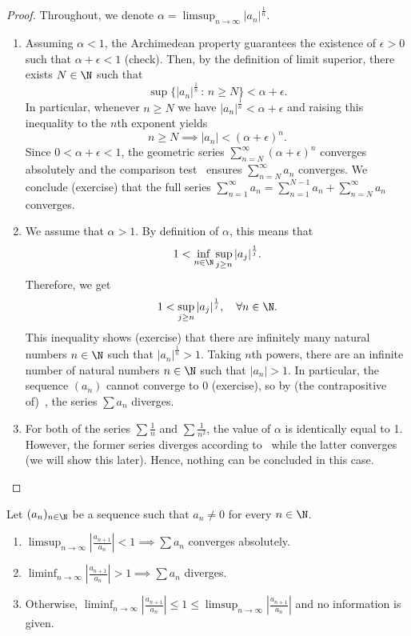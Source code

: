 \begin{proof}
	Throughout, we denote $\alpha = \limsup_{n\to\infty} |a_n|^\frac{1}{n}$.
	\begin{enumerate}[label=\textbf{Root \arabic*)}]
		\item Assuming $\alpha<1$, the Archimedean property guarantees the existence of $\epsilon>0$ such that $\alpha + \epsilon<1$ (check). Then, by the definition of limit superior, there exists $N\in\N$ such that
		\[
		\sup\{ |a_n|^\frac{1}{n} \, : \, n \ge N\} < \alpha + \epsilon.
		\]
		In particular, whenever $n\ge N$ we have $|a_n|^\frac{1}{n} < \alpha + \epsilon$ and raising this inequality to the $n$th exponent yields
		\[
		n\ge N \implies |a_n| < (\alpha + \epsilon)^n.
		\]
		Since $0 < \alpha + \epsilon<1$, the geometric series $\sum_{n=N}^\infty (\alpha + \epsilon)^n$ converges absolutely and the comparison test~ ensures $\sum_{n=N}^\infty a_n$ converges. We conclude (exercise) that the full series $\sum_{n=1}^\infty a_n = \sum_{n=1}^{N-1}a_n + \sum_{n=N}^\infty a_n$ converges.
		\item We assume that $\alpha>1$. By definition of $\alpha$, this means that
		\[
		1 < \inf_{n\in\N} \sup_{j\ge n} |a_j|^\frac{1}{j}.
		\]
		Therefore, we get
		\[
		1 < \sup_{j\ge n} |a_j|^\frac{1}{j}, \quad \forall n\in\N.
		\]
		This inequality shows (exercise) that there are infinitely many natural numbers $n\in\N$ such that $|a_n|^\frac{1}{n}>1$. Taking $n$th powers, there are an infinite number of natural numbers $n\in\N$ such that $|a_n|>1$. In particular, the sequence $(a_n)$ cannot converge to 0 (exercise), so by (the contrapositive of)~, the series $\sum a_n$ diverges.
		\item For both of the series $\sum \frac{1}{n}$ and $\sum \frac{1}{n^2}$, the value of $\alpha$ is identically equal to 1. However, the former series diverges according to~ while the latter converges (we will show this later). Hence, nothing can be concluded in this case.
	\end{enumerate}
\end{proof}
\begin{thm}
	\label{thm:ratiotest}
	Let $(a_n)_{n\in\N}$ be a sequence such that $a_n \neq 0$ for every $n\in\N$.
	\begin{enumerate}[label=\textbf{Ratio \arabic*)}]
		\item $\limsup_{n\to \infty}\left|\frac{a_{n+1}}{a_n}\right| <1 \implies \sum a_n$ converges absolutely.
		\item $\liminf_{n\to \infty}\left|\frac{a_{n+1}}{a_n}\right| >1 \implies \sum a_n$ diverges.
		\item Otherwise, $\liminf_{n\to \infty}\left|\frac{a_{n+1}}{a_n}\right| \le 1 \le \limsup_{n\to \infty}\left|\frac{a_{n+1}}{a_n}\right|$ and no information is given.
	\end{enumerate}
\end{thm}
